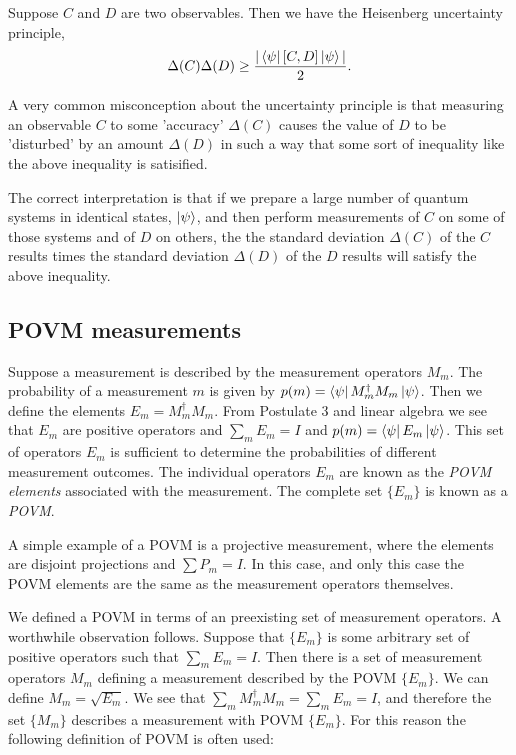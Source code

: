 \documentclass{article}
\begin{document}
\begin{theorem}
  Suppose $C$ and $D$ are two observables. Then we have the Heisenberg uncertainty principle,
  \[\Delta(C)\Delta(D)\ge \frac{|\bra\psi [C,D]\ket\psi|}{2}.\]
\end{theorem}

A very common misconception about the uncertainty principle is that measuring an observable $C$ to some 'accuracy' $\Delta(C)$ causes the value of $D$ to be 'disturbed' by an amount $\Delta(D)$ in such a way that some sort of inequality like the above inequality is satisified.

The correct interpretation is that if we prepare a large number of quantum systems in identical states, $\ket\psi$, and then perform measurements of $C$ on some of those systems and of $D$ on others, the the standard deviation $\Delta(C)$ of the $C$ results times the standard deviation $\Delta(D)$ of the $D$ results will satisfy the above inequality.

\subsection{POVM measurements}

\begin{definition}
   Suppose a measurement is described by the measurement operators $M_m$. The probability of a measurement $m$ is given by $p(m)=\bra\psi M_m^\dagger M_m\ket\psi$. Then we define the elements $E_m=M_m^\dagger M_m$. From Postulate 3 and linear algebra we see that $E_m$ are positive operators and $\sum_m E_m=I$ and $p(m)=\bra\psi E_m\ket\psi$. This set of operators $E_m$ is sufficient to determine the probabilities of different measurement outcomes. The individual operators $E_m$ are known as the \textit{POVM elements} associated with the measurement. The complete set $\{E_m\}$ is known as a \textit{POVM}.
\end{definition}

A simple example of a POVM is a projective measurement, where the elements are disjoint projections and $\sum P_m=I$. In this case, and only this case the POVM elements are the same as the measurement operators themselves.

We defined a POVM in terms of an preexisting set of measurement operators. A worthwhile observation follows. Suppose that $\{E_m\}$ is some arbitrary set of positive operators such that $\sum_m E_m=I$. Then there is a set of measurement operators $M_m$ defining a measurement described by the POVM $\{E_m\}$. We can define $M_m=\sqrt{E_m}$. We see that $\sum_m M_m^\dagger M_m=\sum_mE_m = I$, and therefore the set $\{M_m\}$ describes a measurement with POVM $\{E_m\}$. For this reason the following definition  of POVM is often used:
\end{document}
